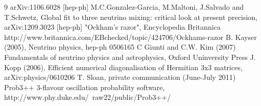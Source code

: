 \begin{thebibliography}{9}
  arXiv:1106.6028 [hep-ph]
  M.C.Gonzalez-Garcia, M.Maltoni, J.Salvado and T.Schwetz,
  Global fit to three neutrino mixing: critical look at present precision,
  arXiv:1209.3023 [hep-ph]
  "Ockham's razor", Encyclopedia Britannica
  http://www.britannica.com/EBchecked/topic/424706/Ockhams-razor
%
%
  B. Kayser (2005), Neutrino physics, hep-ph 0506165
  C Giunti and C.W. Kim (2007) Fundamentals of neutrino physics and astrophysics, Oxford Uninversity Press
  J. Kopp (2006), Efficient numerical diagonalisation of Hermitian 3x3 matrices, arXiv:physics/0610206
%
%
  T. Sloan, private communication (June-July 2011)
  Prob3++ 3-flavour oscillation probability software,
  http://www.phy.duke.edu/~raw22/public/Prob3++/

\end{thebibliography}


